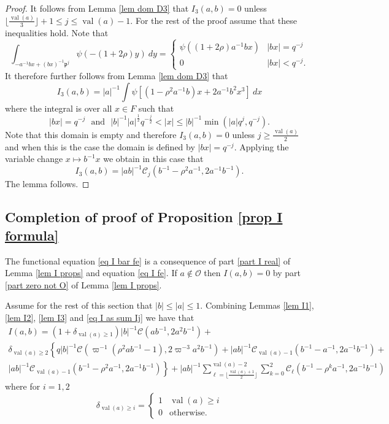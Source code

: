 \documentclass[12pt]{amsart}
\newcommand{\abs}[1]{\left|{#1}\right|}
\newcommand{\p}{\mathfrak{p}}
\renewcommand{\O}{\mathcal{O}}
\newcommand{\val}{{\operatorname{val}}}
\newcommand{\Cu}{\mathcal{C}}
\theoremstyle{remark}
\begin{document}
\begin{proof}
It follows from Lemma \ref{lem dom D3} that $I_3(a,b)=0$ unless $\lfloor \frac{\val(a)}3 \rfloor+1\le j\le \val(a)-1$. For the rest of the proof assume that these inequalities hold. Note that
\[
\int_{- a^{-1}bx+(bx)^{-1}\p^{j}}\psi(-(1+2\rho)y)\ dy=\begin{cases}
\psi((1+2\rho)a^{-1}bx) & \abs{bx}=q^{-j} \\ 
0 & \abs{bx}<q^{-j}.
\end{cases}
\]
It therefore further follows from Lemma \ref{lem dom D3} that
\[
I_3(a,b)=\abs{a}^{-1}\int \psi[(1-\rho^2 a^{-1}b)x+2a^{-1}b^2 x^3]\ dx
\]
where the integral is over all $x\in F$ such that 
\[
\abs{bx}=q^{-j}\ \ \ \text{and} \ \ \ \abs{b}^{-1}\abs{a}^{\frac12}q^{-\frac{j}2}<\abs{x}\le \abs{b}^{-1}\min(\abs{a}q^j,q^{-j}).
\]
Note that this domain is empty and therefore $I_3(a,b)=0$ unless $j\ge \frac{\val(a)}2$ and when this is the case the domain is defined by $\abs{bx}=q^{-j}$. 
Applying the variable change $x\mapsto b^{-1}x$ we obtain in this case that
\[
I_3(a,b)=\abs{ab}^{-1}\Cu_j(b^{-1}-\rho^2a^{-1},2a^{-1}b^{-1}).
\]
The lemma follows.
\end{proof}

\subsection{Completion of proof of Proposition \ref{prop I formula}}
The functional equation  \eqref{eq I bar fe} is a consequence of part \eqref{part I real} of Lemma \ref{lem I props}  and equation \eqref{eq I fe}.
If $a\not\in\O$ then $I(a,b)=0$ by part \eqref{part zero not O} of Lemma \ref{lem I props}. 
 
Assume for the rest of this section that $\abs{b}\le \abs{a}\le 1$. 
Combining Lemmas \ref{lem I1}, \ref{lem I2}, \ref{lem I3} and \eqref{eq I as  sum Ij} we have that
\begin{multline*}
I(a,b)=(1+\delta_{\val(a)\ge 1})\abs{b}^{-1}\Cu(ab^{-1},2a^2b^{-1})+ \\
\delta_{\val(a)\ge 2}\left\{
q\abs{b}^{-1}\Cu(\varpi^{-1}(\rho^2ab^{-1}-1),2\varpi^{-3}a^2b^{-1})+
\abs{ab}^{-1}\Cu_{\val(a)-1}(b^{-1}-a^{-1},2a^{-1}b^{-1})+ \right. \\
\left. \abs{ab}^{-1}\Cu_{\val(a)-1}(b^{-1}-\rho^2a^{-1},2a^{-1}b^{-1})\right\}+ 
\abs{ab}^{-1}\sum_{\ell=\lfloor\frac{\val(a)+1}2\rfloor}^{\val(a)-2} \sum_{k=0}^2 \Cu_\ell(b^{-1}-\rho^k a^{-1},2a^{-1}b^{-1})
\end{multline*}
where for $i=1,2$
\[
\delta_{\val(a)\ge i}=\begin{cases}
1 & \val(a)\ge i \\
0 & \text{otherwise.}
\end{cases}
\]
\end{document}
